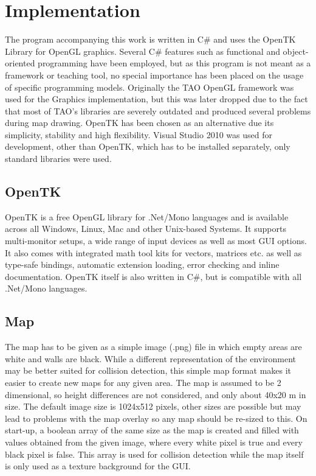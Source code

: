 \chapter{Implementation}
\label{cha:implementation}

The program accompanying this work is written in C# and uses the OpenTK Library for OpenGL graphics. Several C# features such as functional and object-oriented programming have been employed, but as this program is not meant as a framework or teaching tool, no special importance has been placed on the usage of specific programming models. 
Originally the TAO OpenGL framework was used for the Graphics implementation, but this was later dropped due to the fact that most of TAO's libraries are severely outdated and produced several problems during map drawing. OpenTK has been chosen as an alternative due its simplicity, stability and high flexibility. 
Visual Studio 2010 was used for development, other than OpenTK, which has to be installed separately, only standard libraries were used.

\section{OpenTK}
\label{sec:opentk}

OpenTK is a free OpenGL library for .Net/Mono languages and is available across all Windows, Linux, Mac and other Unix-based Systems. It supports multi-monitor setups, a wide range of input devices as well as most GUI options. It also comes with integrated math tool kits for vectors, matrices etc. as well as type-safe bindings, automatic extension loading, error checking and inline documentation. OpenTK itself is also written in C#, but is compatible with all .Net/Mono languages\cite{36}.

\section{Map}
\label{sec:map}

The map has to be given as a simple image (.png) file in which empty areas are white and walls are black. While a different representation of the environment may be better suited for collision detection, this simple map format makes it easier to create new maps for any given area. The map is assumed to be 2 dimensional, so height differences are not considered, and only about 40x20 m in size. The default image size is 1024x512 pixels, other sizes are possible but may lead to problems with the map overlay so any map should be re-sized to this. On start-up, a boolean array of the same size as the map is created and filled with values obtained from the given image, where every white pixel is true and every black pixel is false. This array is used for collision detection while the map itself is only used as a texture background for the GUI.

